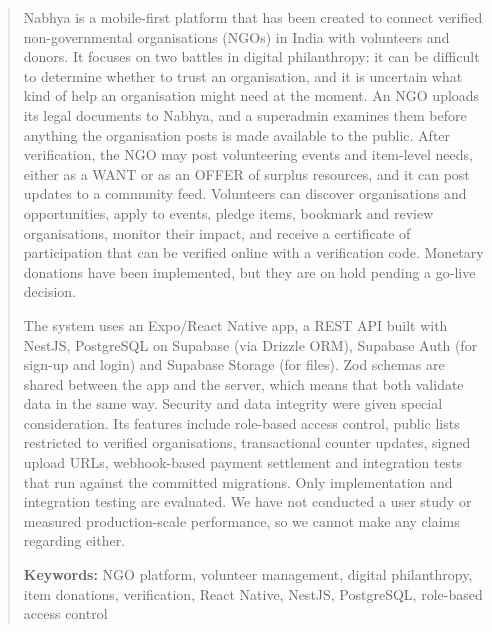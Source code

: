 \begin{abstract}
Nabhya is a mobile-first platform that has been created to connect verified non-governmental organisations (NGOs) in India with volunteers and donors. It focuses on two battles in digital philanthropy: it can be difficult to determine whether to trust an organisation, and it is uncertain what kind of help an organisation might need at the moment. An NGO uploads its legal documents to Nabhya, and a superadmin examines them before anything the organisation posts is made available to the public. After verification, the NGO may post volunteering events and item-level needs, either as a WANT or as an OFFER of surplus resources, and it can post updates to a community feed. Volunteers can discover organisations and opportunities, apply to events, pledge items, bookmark and review organisations, monitor their impact, and receive a certificate of participation that can be verified online with a verification code. Monetary donations have been implemented, but they are on hold pending a go-live decision.

The system uses an Expo/React Native app, a REST API built with NestJS, PostgreSQL on Supabase (via Drizzle ORM), Supabase Auth (for sign-up and login) and Supabase Storage (for files). Zod schemas are shared between the app and the server, which means that both validate data in the same way. Security and data integrity were given special consideration. Its features include role-based access control, public lists restricted to verified organisations, transactional counter updates, signed upload URLs, webhook-based payment settlement and integration tests that run against the committed migrations. Only implementation and integration testing are evaluated. We have not conducted a user study or measured production-scale performance, so we cannot make any claims regarding either.
\vspace{0.15in}

\noindent\textbf{Keywords:} NGO platform, volunteer management, digital philanthropy, item donations, verification, React Native, NestJS, PostgreSQL, role-based access control
\end{abstract}

\tableofcontents
\listoffigures
\listoftables

